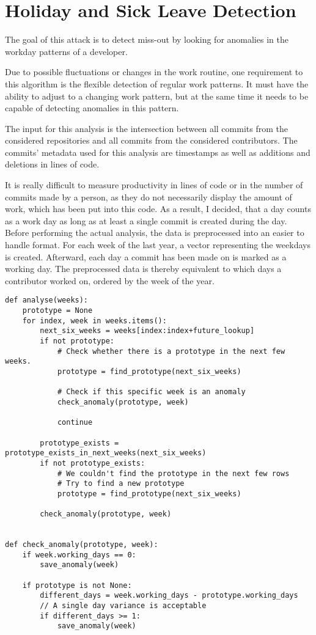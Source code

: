 \section{Holiday and Sick Leave Detection}

The goal of this attack is to detect miss-out by looking for anomalies in the workday patterns of a developer.

Due to possible fluctuations or changes in the work routine, one requirement to this algorithm is the flexible detection of regular work patterns.
It must have the ability to adjust to a changing work pattern, but at the same time it needs to be capable of detecting anomalies in this pattern.

The input for this analysis is the intersection between all commits from the considered repositories and all commits from the considered contributors.
The commits' metadata used for this analysis are timestamps as well as additions and deletions in lines of code.

It is really difficult to measure productivity in lines of code or in the number of commits made by a person, as they do not necessarily display the amount of work, which has been put into this code.
As a result, I decided, that a day counts as a work day as long as at least a single commit is created during the day.
Before performing the actual analysis, the data is preprocessed into an easier to handle format.
For each week of the last year, a vector representing the weekdays is created.
Afterward, each day a commit has been made on is marked as a working day.
The preprocessed data is thereby equivalent to which days a contributor worked on, ordered by the week of the year.

\begin{verbatim}
def analyse(weeks):
    prototype = None
    for index, week in weeks.items():
        next_six_weeks = weeks[index:index+future_lookup]
        if not prototype:
            # Check whether there is a prototype in the next few weeks.
            prototype = find_prototype(next_six_weeks)

            # Check if this specific week is an anomaly
            check_anomaly(prototype, week)

            continue

        prototype_exists = prototype_exists_in_next_weeks(next_six_weeks)
        if not prototype_exists:
            # We couldn't find the prototype in the next few rows
            # Try to find a new prototype
            prototype = find_prototype(next_six_weeks)

        check_anomaly(prototype, week)


def check_anomaly(prototype, week):
    if week.working_days == 0:
        save_anomaly(week)

    if prototype is not None:
        different_days = week.working_days - prototype.working_days
        // A single day variance is acceptable
        if different_days >= 1:
            save_anomaly(week)

\end{verbatim}
\begingroup
{}\label{lst:miss-out-algorithm}
\endgroup

